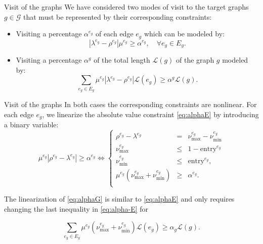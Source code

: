 \documentclass[slidestop,usepdftitle=false,10pt]{beamer}
\begin{document}
    \begin{frame}{Visit of the graphs}
	    We have considered two modes of visit to the target graphs $g\in \mathcal{G}$ that must be represented by their corresponding constraints:
        \begin{itemize}
            \item Visiting a percentage $\alpha^{e_g}$ of each edge $e_g$ which can be modeled by:
            \begin{equation}\label{eq:alphaE}\tag{$\alpha$-E}
            |\lambda^{e_g} - \rho^{e_g}|\mu^{e_g}\geq \alpha^{e_g}, \quad \forall e_g\in E_g.
            \end{equation}
            \item Visiting a percentage $\alpha^g$ of the total length $\mathcal L(g)$ of the graph $g$ modeled by:
            \begin{equation}\label{eq:alphaG}\tag{$\alpha$-G}
            \sum_{e_g\in E_g} \mu^{e_g}|\lambda^{e_g} - \rho^{e_g}|\mathcal L(e_g) \geq \alpha^g\mathcal L(g).
            \end{equation}
        \end{itemize}
	\end{frame}
	
	\begin{frame}{Visit of the graphs}
	    In both cases the corresponding constraints are nonlinear. For each edge $e_g$, we linearize the absolute value constraint \eqref{eq:alphaE} by introducing a binary variable:
        \begin{equation}\label{eq:alpha-E}\tag{$\alpha$-E}
         \mu^{e_g}|\rho^{e_g}-\lambda^{e_g}|\geq \alpha^{e_g} \Longleftrightarrow
         \left\{
         \begin{array}{ccl}
          \rho^{e_g} - \lambda^{e_g}                       & =    & \nu_\text{max}^{e_g} - \nu_\text{min}^{e_g}                                     \\
          \nu_\text{max}^{e_g}                         & \leq & 1-{\text{entry}^{e_g}}                                    \\
          \nu_\text{min}^{e_g}                      & \leq & {  \text{entry}^{e_g}},                                        \\
          \mu^{e_g}(\nu_\text{max}^{e_g} + \nu_\text{min}^{e_g} ) & \geq & \alpha^{e_g}.
          \\
         \end{array}
         \right.
        \end{equation}
        
        \noindent
        The linearization of \eqref{eq:alphaG} is similar to \eqref{eq:alphaE} and only requires changing the last inequality in \eqref{eq:alpha-E} for
        
        \begin{equation}\label{eq:alpha-G}\tag{$\alpha$-G}
        \sum_{e_g\in E_g} \mu^{e_g}(\nu_\text{max}^{e_g} + \nu_\text{min}^{e_g})\mathcal L(e_g)\geq \alpha_g\mathcal L(g).
        \end{equation}
	\end{frame}
	
\end{document}
